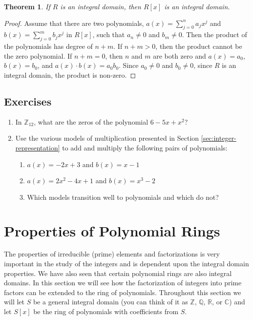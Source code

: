 \documentclass[
]{book}
\providecommand{\tightlist}{%
  \setlength{\itemsep}{0pt}\setlength{\parskip}{0pt}}
\newtheorem{theorem}{Theorem}[chapter]
\theoremstyle{definition}
\theoremstyle{definition}
\theoremstyle{definition}
\theoremstyle{remark}
\begin{document}
\begin{theorem}
\protect\hypertarget{thm:Polynomial-Integral-Domain}{}{\label{thm:Polynomial-Integral-Domain} }If \(R\) is an integral domain, then \(R[x]\) is an integral domain.
\end{theorem}

\begin{proof}
{}Assume that there are two polynomials, \(a(x)=\sum_{j=0}^n a_j x^j\) and \(b(x)=\sum_{j=0}^m b_j x^j\) in \(R[x]\), such that \(a_n\neq 0\) and \(b_m\neq 0\). Then the product of the polynomials has degree of \(n+m\). If \(n+m>0\), then the product cannot be the zero polynomial. If \(n+m=0\), then \(n\) and \(m\) are both zero and \(a(x)=a_0\), \(b(x)=b_0\), and \(a(x)\cdot b(x)=a_0 b_0\). Since \(a_0\neq 0\) and \(b_0\neq 0\), since \(R\) is an integral domain, the product is non-zero.
\end{proof}

\hypertarget{exercises-24}{%
\subsection{Exercises}\label{exercises-24}}

\begin{enumerate}
\def\labelenumi{\arabic{enumi}.}
\item
  In \(\mathbb{Z}_{12}\), what are the zeros of the polynomial \(6-5x+x^2\)?
\item
  Use the various models of multiplication presented in Section \ref{sec:integer-representation} to add and multiply the following pairs of polynomials:

  \begin{enumerate}
  \def\labelenumii{\alph{enumii}.}
  \tightlist
  \item
    \(a(x)=-2x+3\) and \(b(x)=x-1\)
  \item
    \(a(x)=2x^2-4x+1\) and \(b(x)=x^3-2\)
  \item
    Which models transition well to polynomials and which do not?
  \end{enumerate}
\end{enumerate}

\hypertarget{properties-of-polynomial-rings}{%
\section{Properties of Polynomial Rings}\label{properties-of-polynomial-rings}}

The properties of irreducible (prime) elements and factorizations is very important in the study of the integers and is dependent upon the integral domain properties. We have also seen that certain polynomial rings are also integral domains. In this section we will see how the factorization of integers into prime factors can be extended to the ring of polynomials. Throughout this section we will let \(S\) be a general integral domain (you can think of it as \(\mathbb{Z}\), \(\mathbb{Q}\), \(\mathbb{R}\), or \(\mathbb{C}\)) and let \(S[x]\) be the ring of polynomials with coefficients from \(S\).
\end{document}
